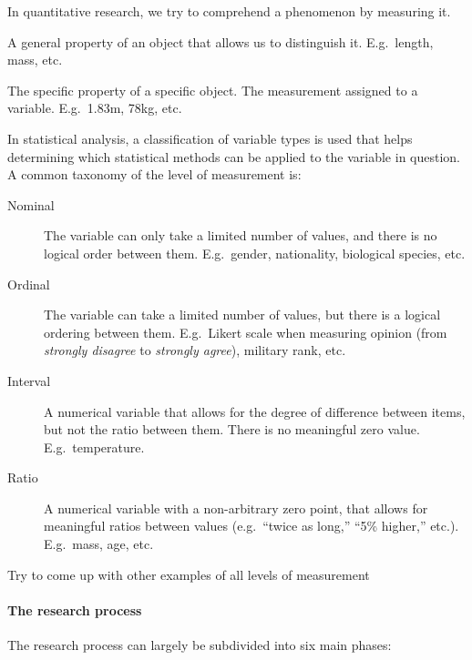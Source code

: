 In quantitative research, we try to comprehend a phenomenon by measuring it.

\begin{definition}[Variable]
     A general property of an object that allows us to distinguish it. E.g.~length, mass, etc.
\end{definition}

\begin{definition}[Value]
    The specific property of a specific object. The measurement assigned to a variable. E.g.~1.83m, 78kg, etc.
\end{definition}

In statistical analysis, a classification of variable types is used that helps determining which statistical methods can be applied to the variable in question. A common taxonomy of the level of measurement is:

\begin{description}
	\item [Nominal] The variable can only take a limited number of values, and there is no logical order between them. E.g.~gender, nationality, biological species, etc.
	\item [Ordinal] The variable can take a limited number of values, but there is a logical ordering between them. E.g.~Likert scale when measuring opinion (from \emph{strongly disagree} to \emph{strongly agree}), military rank, etc.
	\item [Interval] A numerical variable that allows for the degree of difference between items, but not the ratio between them. There is no meaningful zero value. E.g.~temperature.
	\item [Ratio] A numerical variable with a non-arbitrary zero point, that allows for meaningful ratios between values (e.g.~``twice as long,'' ``5\% higher,'' etc.). E.g.~mass, age, etc.
\end{description}

\begin{exercise}
	Try to come up with other examples of all levels of measurement
\end{exercise}

\paragraph{The research process}

The research process can largely be subdivided into six main phases:

